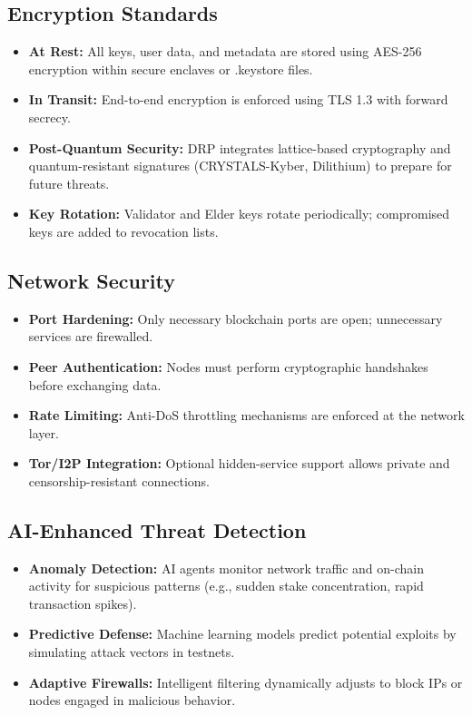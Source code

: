 \documentclass[11pt,a4paper]{article}
\begin{document}
\subsection{Encryption Standards}
\begin{itemize}
    \item \textbf{At Rest:} All keys, user data, and metadata are stored using AES-256 encryption within secure enclaves or .keystore files.  
    \item \textbf{In Transit:} End-to-end encryption is enforced using TLS 1.3 with forward secrecy.  
    \item \textbf{Post-Quantum Security:} DRP integrates lattice-based cryptography and quantum-resistant signatures (CRYSTALS-Kyber, Dilithium) to prepare for future threats.  
    \item \textbf{Key Rotation:} Validator and Elder keys rotate periodically; compromised keys are added to revocation lists.  
\end{itemize}

\subsection{Network Security}
\begin{itemize}
    \item \textbf{Port Hardening:} Only necessary blockchain ports are open; unnecessary services are firewalled.  
    \item \textbf{Peer Authentication:} Nodes must perform cryptographic handshakes before exchanging data.  
    \item \textbf{Rate Limiting:} Anti-DoS throttling mechanisms are enforced at the network layer.  
    \item \textbf{Tor/I2P Integration:} Optional hidden-service support allows private and censorship-resistant connections.  
\end{itemize}

\subsection{AI-Enhanced Threat Detection}
\begin{itemize}
    \item \textbf{Anomaly Detection:} AI agents monitor network traffic and on-chain activity for suspicious patterns (e.g., sudden stake concentration, rapid transaction spikes).  
    \item \textbf{Predictive Defense:} Machine learning models predict potential exploits by simulating attack vectors in testnets.  
    \item \textbf{Adaptive Firewalls:} Intelligent filtering dynamically adjusts to block IPs or nodes engaged in malicious behavior.  
\end{itemize}
\end{document}

